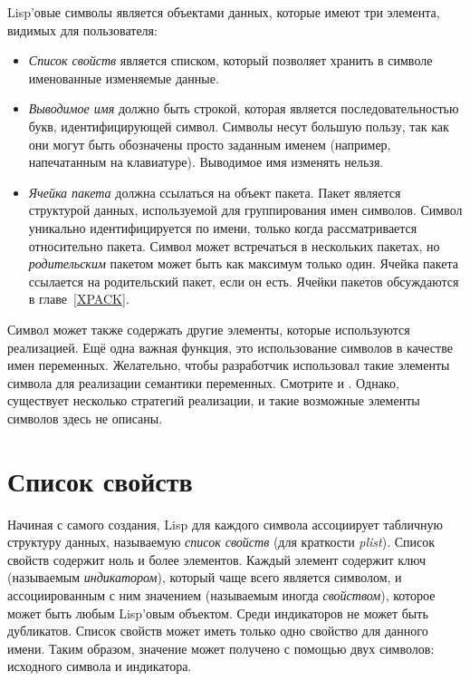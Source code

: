 Lisp'овые символы является объектами данных, которые имеют три элемента, видимых
для пользователя:
\begin{itemize}
\item
\emph{Список свойств} является списком, который позволяет хранить в символе
именованные изменяемые данные.

\item
\emph{Выводимое имя} должно быть строкой, которая является последовательностью
букв, идентифицирующей символ. Символы несут большую пользу, так
как они могут быть обозначены просто заданным именем (например, напечатанным на
клавиатуре).
Выводимое имя изменять нельзя.

\item
\emph{Ячейка пакета} должна ссылаться на объект пакета.
Пакет является структурой данных, используемой для группирования имен символов.
Символ уникально идентифицируется по имени, только когда рассматривается
относительно пакета. Символ может встречаться в нескольких пакетах, но
\emph{родительским} пакетом может быть как максимум только один.
Ячейка пакета ссылается на родительский пакет, если он есть.
Ячейки пакетов обсуждаются в главе~\ref{XPACK}.
\end{itemize}

Символ может также содержать другие элементы, которые используются
реализацией. Ещё одна важная функция, это использование символов в качестве
имен переменных.  Желательно, чтобы разработчик использовал такие элементы
символа для реализации семантики переменных. Смотрите  и
. Однако, существует несколько стратегий реализации, и
такие возможные элементы символов здесь не описаны.

\section{Список свойств}

Начиная с самого создания, Lisp для каждого символа ассоциирует табличную
структуру данных, называемую \emph{список свойств} (для краткости \emph{plist}).
Список свойств содержит ноль и более элементов. Каждый элемент содержит ключ
(называемым \emph{индикатором}), который чаще всего является символом, и
ассоциированным с ним значением (называемым иногда \emph{свойством}), которое
может быть любым Lisp'овым объектом.
Среди индикаторов не может быть дубликатов. Список свойств может иметь только
одно свойство для данного имени. Таким образом, значение может получено с
помощью двух символов: исходного символа и индикатора.

